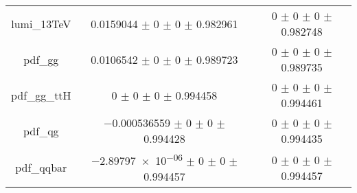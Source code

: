 \begin{table}
\begin{tabular}{ccc}
lumi\_13TeV & \num{0.0159044} $\pm$ \num{0} $\pm$ \num{0} $\pm$ \num{0.982961} & \num{0} $\pm$ \num{0} $\pm$ \num{0} $\pm$ \num{0.982748}\\
pdf\_gg & \num{0.0106542} $\pm$ \num{0} $\pm$ \num{0} $\pm$ \num{0.989723} & \num{0} $\pm$ \num{0} $\pm$ \num{0} $\pm$ \num{0.989735}\\
pdf\_gg\_ttH & \num{0} $\pm$ \num{0} $\pm$ \num{0} $\pm$ \num{0.994458} & \num{0} $\pm$ \num{0} $\pm$ \num{0} $\pm$ \num{0.994461}\\
pdf\_qg & \num{-0.000536559} $\pm$ \num{0} $\pm$ \num{0} $\pm$ \num{0.994428} & \num{0} $\pm$ \num{0} $\pm$ \num{0} $\pm$ \num{0.994435}\\
pdf\_qqbar & \num{-2.89797e-06} $\pm$ \num{0} $\pm$ \num{0} $\pm$ \num{0.994457} & \num{0} $\pm$ \num{0} $\pm$ \num{0} $\pm$ \num{0.994457}\\
\bottomrule
\end{tabular}
\end{table}